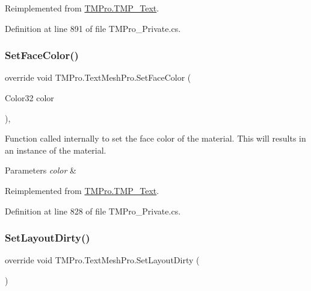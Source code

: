 Reimplemented from \mbox{\hyperlink{class_t_m_pro_1_1_t_m_p___text_afd461774563d324758a3d21f5085edf1}{T\+M\+Pro.\+T\+M\+P\+\_\+\+Text}}.



Definition at line 891 of file T\+M\+Pro\+\_\+\+Private.\+cs.

\mbox{\label{class_t_m_pro_1_1_text_mesh_pro_a6819493b73133ce05a35daa481101d8e}} 
\subsubsection{\texorpdfstring{SetFaceColor()}{SetFaceColor()}}
{\footnotesize\ttfamily override void T\+M\+Pro.\+Text\+Mesh\+Pro.\+Set\+Face\+Color (\begin{DoxyParamCaption}\item[{Color32}]{color }\end{DoxyParamCaption})\hspace{0.3cm}{\ttfamily [protected]}, {\ttfamily [virtual]}}



Function called internally to set the face color of the material. This will results in an instance of the material. 


\begin{DoxyParams}{Parameters}
{\em color} & \\
\hline
\end{DoxyParams}


Reimplemented from \mbox{\hyperlink{class_t_m_pro_1_1_t_m_p___text_a7737931333692ee9f01dd1e94cf68a45}{T\+M\+Pro.\+T\+M\+P\+\_\+\+Text}}.



Definition at line 828 of file T\+M\+Pro\+\_\+\+Private.\+cs.

\mbox{\label{class_t_m_pro_1_1_text_mesh_pro_ab11edb348c490d22eca925f2a96029e3}} 
\subsubsection{\texorpdfstring{SetLayoutDirty()}{SetLayoutDirty()}}
{\footnotesize\ttfamily override void T\+M\+Pro.\+Text\+Mesh\+Pro.\+Set\+Layout\+Dirty (\begin{DoxyParamCaption}{ }\end{DoxyParamCaption})}







